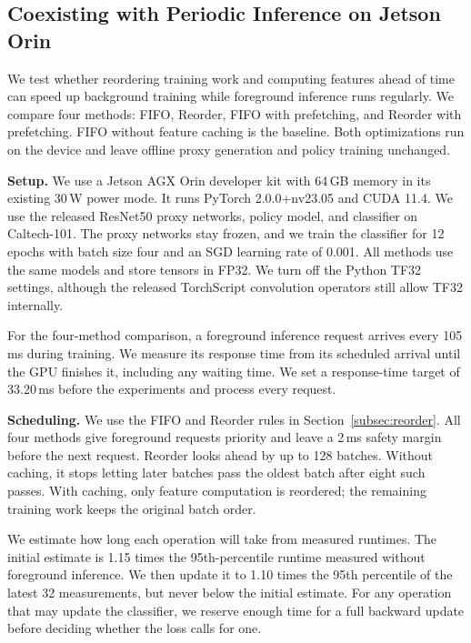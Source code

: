 \begingroup
\color{blue}
\subsection{Coexisting with Periodic Inference on Jetson Orin}
\label{subsec:orin-periodic}

We test whether reordering training work and computing features ahead of time can speed up background training while foreground inference runs regularly.
We compare four methods: FIFO, Reorder, FIFO with prefetching, and Reorder with prefetching.
FIFO without feature caching is the baseline.
Both optimizations run on the device and leave offline proxy generation and policy training unchanged.

\noindent \textbf{Setup.}
We use a Jetson AGX Orin developer kit with 64\,GB memory in its existing 30\,W power mode.
It runs PyTorch 2.0.0+nv23.05 and CUDA 11.4.
We use the released ResNet50 proxy networks, policy model, and classifier on Caltech-101.
The proxy networks stay frozen, and we train the classifier for 12 epochs with batch size four and an SGD learning rate of 0.001.
All methods use the same models and store tensors in FP32.
We turn off the Python TF32 settings, although the released TorchScript convolution operators still allow TF32 internally.

For the four-method comparison, a foreground inference request arrives every 105\,ms during training.
We measure its response time from its scheduled arrival until the GPU finishes it, including any waiting time.
We set a response-time target of 33.20\,ms before the experiments and process every request.

\noindent \textbf{Scheduling.}
We use the FIFO and Reorder rules in Section~\ref{subsec:reorder}.
All four methods give foreground requests priority and leave a 2\,ms safety margin before the next request.
Reorder looks ahead by up to 128 batches.
Without caching, it stops letting later batches pass the oldest batch after eight such passes.
With caching, only feature computation is reordered; the remaining training work keeps the original batch order.

We estimate how long each operation will take from measured runtimes.
The initial estimate is 1.15 times the 95th-percentile runtime measured without foreground inference.
We then update it to 1.10 times the 95th percentile of the latest 32 measurements, but never below the initial estimate.
For any operation that may update the classifier, we reserve enough time for a full backward update before deciding whether the loss calls for one.

